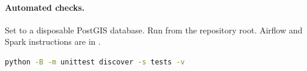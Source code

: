 \documentclass[a4paper,11pt,oneside]{book}
\begin{document}
\begin{appendices}
\paragraph{Automated checks.}
Set  to a disposable PostGIS database. Run from the repository root. Airflow and Spark instructions are in .

\begin{lstlisting}[language=bash,numbers=none,aboveskip=4pt,belowskip=4pt]
python -B -m unittest discover -s tests -v
\end{lstlisting}

    \end{appendices}
\end{document}
